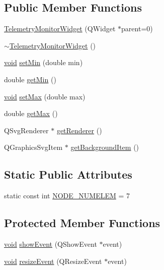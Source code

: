 \subsection*{\-Public \-Member \-Functions}
\begin{DoxyCompactItemize}
\item 
\hyperlink{group___core_plugin_gad504dfdc75617a3ffeca5fe48d5d4213}{\-Telemetry\-Monitor\-Widget} (\-Q\-Widget $\ast$parent=0)
\item 
\hyperlink{group___core_plugin_gaabfd0e1f4c040820ba4ad3c945d57fae}{$\sim$\-Telemetry\-Monitor\-Widget} ()
\item 
\hyperlink{group___u_a_v_objects_plugin_ga444cf2ff3f0ecbe028adce838d373f5c}{void} \hyperlink{group___core_plugin_ga62f75cdceb4772c546e7976cefa640c4}{set\-Min} (double min)
\item 
double \hyperlink{group___core_plugin_gaa48e3a67c60d209ac6f6bc4e22f0a83e}{get\-Min} ()
\item 
\hyperlink{group___u_a_v_objects_plugin_ga444cf2ff3f0ecbe028adce838d373f5c}{void} \hyperlink{group___core_plugin_gaaadf88ad2a3d337af50fa9ecca70994d}{set\-Max} (double max)
\item 
double \hyperlink{group___core_plugin_gaaafaa37d9270c6c00dca641b031dc01d}{get\-Max} ()
\item 
\-Q\-Svg\-Renderer $\ast$ \hyperlink{group___core_plugin_ga6b01d26a55c6500d36cfa7b0804bdd7e}{get\-Renderer} ()
\item 
\-Q\-Graphics\-Svg\-Item $\ast$ \hyperlink{group___core_plugin_ga5a468a0eff7d437394e1f4801c407248}{get\-Background\-Item} ()
\end{DoxyCompactItemize}
\subsection*{\-Static \-Public \-Attributes}
\begin{DoxyCompactItemize}
\item 
static const int \hyperlink{group___core_plugin_ga9fb2babad70f7d5d248f4dfe51cda6d5}{\-N\-O\-D\-E\-\_\-\-N\-U\-M\-E\-L\-E\-M} = 7
\end{DoxyCompactItemize}
\subsection*{\-Protected \-Member \-Functions}
\begin{DoxyCompactItemize}
\item 
\hyperlink{group___u_a_v_objects_plugin_ga444cf2ff3f0ecbe028adce838d373f5c}{void} \hyperlink{group___core_plugin_ga779c70f16ec4063c14a5cccf452ba141}{show\-Event} (\-Q\-Show\-Event $\ast$event)
\item 
\hyperlink{group___u_a_v_objects_plugin_ga444cf2ff3f0ecbe028adce838d373f5c}{void} \hyperlink{group___core_plugin_gac7d39d506412ed065e43035e2d80b6e7}{resize\-Event} (\-Q\-Resize\-Event $\ast$event)
\end{DoxyCompactItemize}


